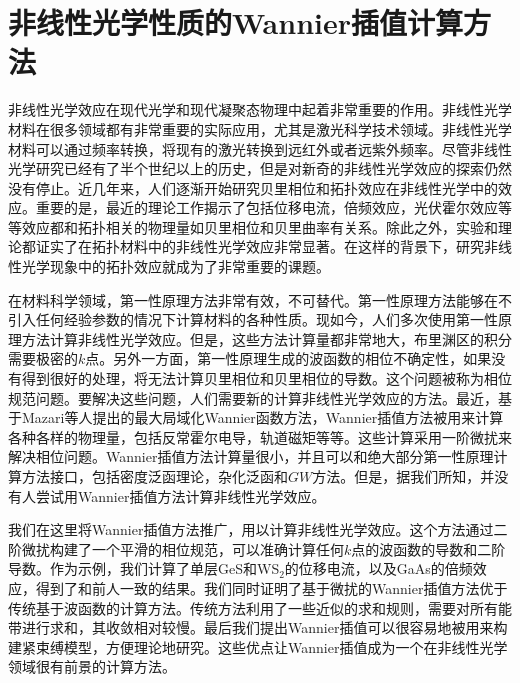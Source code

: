 \chapter{非线性光学性质的Wannier插值计算方法}

非线性光学效应在现代光学和现代凝聚态物理中起着非常重要的作用\cite{boyd-nlo}。非线性光学材料在很多领域都有非常重要的实际应用，尤其是激光科学技术领域\cite{nurmikko-compact,kanai_generation_2004,boyd-nlo}。非线性光学材料可以通过频率转换，将现有的激光转换到远红外或者远紫外频率\cite{nurmikko-compact,kanai_generation_2004}。尽管非线性光学研究已经有了半个世纪以上的历史，但是对新奇的非线性光学效应的探索仍然没有停止\cite{young2012,young2012_2,tan2016,morimoto2016,morimoto2016prb,rangel_giant_2016,cook_design_2017,wu_giant_2017}。近几年来，人们逐渐开始研究贝里相位和拓扑效应在非线性光学中的效应\cite{xiao_berry_2010,hasan2010,qi2011}。重要的是，最近的理论工作揭示了包括位移电流，倍频效应，光伏霍尔效应等等效应都和拓扑相关的物理量如贝里相位和贝里曲率有关系\cite{morimoto2016,morimoto2016prb}。除此之外，实验和理论都证实了在拓扑材料中的非线性光学效应非常显著\cite{tan2016,wu_giant_2017}。在这样的背景下，研究非线性光学现象中的拓扑效应就成为了非常重要的课题。

在材料科学领域，第一性原理方法非常有效，不可替代。第一性原理方法能够在不引入任何经验参数的情况下计算材料的各种性质。现如今，人们多次使用第一性原理方法计算非线性光学效应\cite{sipe_second-order_2000,young2012,rangel_giant_2016,cook_design_2017}。但是，这些方法计算量都非常地大，布里渊区的积分需要极密的$k$点。另外一方面，第一性原理生成的波函数的相位不确定性，如果没有得到很好的处理，将无法计算贝里相位和贝里相位的导数。这个问题被称为相位规范问题。要解决这些问题，人们需要新的计算非线性光学效应的方法。最近，基于Mazari等人提出的最大局域化Wannier函数方法\cite{marzari_maximally_1997,marzari2012}，Wannier插值方法被用来计算各种各样的物理量，包括反常霍尔电导，轨道磁矩等等\cite{wang_textitab_2006,yates_spectral_2007,lopez_wannier-based_2012}。这些计算采用一阶微扰来解决相位问题。Wannier插值方法计算量很小，并且可以和绝大部分第一性原理计算方法接口，包括密度泛函理论，杂化泛函和$GW$方法。但是，据我们所知，并没有人尝试用Wannier插值方法计算非线性光学效应。


我们在这里将Wannier插值方法推广，用以计算非线性光学效应。这个方法通过二阶微扰构建了一个平滑的相位规范，可以准确计算任何$k$点的波函数的导数和二阶导数。作为示例，我们计算了单层GeS和WS$_2$的位移电流，以及GaAs的倍频效应，得到了和前人一致的结果\cite{rangel_giant_2016,nastos_scissors_2005}。我们同时证明了基于微扰的Wannier插值方法优于传统基于波函数的计算方法。传统方法利用了一些近似的求和规则\cite{sipe_second-order_2000,cook_design_2017}，需要对所有能带进行求和，其收敛相对较慢。最后我们提出Wannier插值可以很容易地被用来构建紧束缚模型，方便理论地研究。这些优点让Wannier插值成为一个在非线性光学领域很有前景的计算方法。

